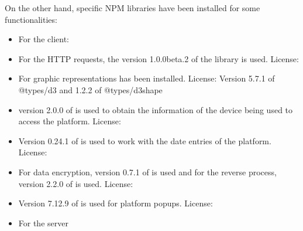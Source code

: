 \documentclass[letterpaper,10pt,english]{sphinxmanual}
\begin{document}
On the other hand, specific NPM libraries have been installed for some functionalities:
\begin{itemize}
\item {} 
For the client:

\end{itemize}
\begin{itemize}
\item {} 
For the HTTP requests, the version 1.0.0\sphinxhyphen{}beta.2 of the library  is used. License: 

\item {} 
For graphic representations  has been installed. License:  Version 5.7.1 of @types/d3 and 1.2.2 of @types/d3\sphinxhyphen{}shape

\item {} 
version 2.0.0 of  is used to obtain the information of the device being used to access the platform. License: 

\item {} 
Version 0.24.1 of  is used to work with the date entries of the platform. License: 

\item {} 
For data encryption, version 0.7.1 of  is used and for the reverse process, version 2.2.0 of  is used. License: 

\item {} 
Version 7.12.9 of  is used for platform popups. License: 

\end{itemize}
\begin{itemize}
\item {} 
For the server

\end{itemize}
\end{document}
